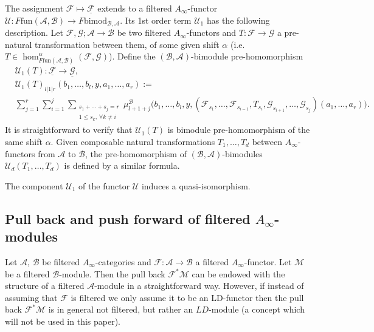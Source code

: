 The assignment $\mathcal{F} \longmapsto \underline{\mathcal{F}}$
extends to a filtered $A_{\infty}$-functor
$\mathcal{U}: F\text{fun}(\mathcal{A}, \mathcal{B}) \longrightarrow
F\text{bimod}_{\mathcal{B}, \mathcal{A}}$. Its 1st order term
$\mathcal{U}_1$ has the following description. Let
$\mathcal{F}, \mathcal{G}; \mathcal{A} \longrightarrow \mathcal{B}$ be
two filtered $A_{\infty}$-functors and
$T: \mathcal{F} \longrightarrow \mathcal{G}$ a pre-natural
transformation between them, of some given shift $\alpha$
(i.e.~$T \in \hom^{\alpha}_{F\text{fun}(\mathcal{A},
  \mathcal{B})}(\mathcal{F}, \mathcal{G})$). Define the
$(\mathcal{B}, \mathcal{A})$-bimodule pre-homomorphism
\begin{equation*}
  \begin{aligned}
    & \mathcal{U}_1(T)\colon \underline{\mathcal{F}} \longrightarrow \underline{\mathcal{G}},
    \\
    & \mathcal{U}_1(T)_{l|1|r}(b_1,\ldots, b_l, y,a_1,\ldots, a_r):= \\
    & \sum_{j=1}^r\sum_{i=1}^j\sum_{\substack
      {s_1 + \cdots + s_j = r  \\ 1 \leq s_k, \, 
    \forall k \neq i}}
    \mu^{\mathcal{B}}_{l+1+j}\bigl(b_1,\ldots, b_l,y, (\mathcal{F}_{s_1},\ldots,
    \mathcal{F}_{s_{i-1}},T_{s_i},\mathcal{G}_{s_{i+1}}, \ldots,
    \mathcal{G}_{s_j})(a_1,\ldots, a_r)\bigr).
  \end{aligned}
\end{equation*}
It is straightforward to verify that $\mathcal{U}_1(T)$ is bimodule
pre-homomorphism of the same shift $\alpha$. Given composable natural
transformations $T_1,\ldots, T_d$ between $A_\infty$-functors from
$\mathcal{A}$ to $\mathcal{B}$, the pre-homomorphism of
$(\mathcal{B},\mathcal{A})$-bimodules $\mathcal{U}_d(T_1,\ldots, T_d)$
is defined by a similar formula.

\begin{lem}
  The component $\mathcal{U}_1$ of the functor $\mathcal{U}$ induces a
  quasi-isomorphism.
\end{lem}


\subsection{Pull back and push forward of filtered
  $A_{\infty}$-modules} \label{ap:pshf}

Let $\mathcal{A}$, $\mathcal{B}$ be filtered $A_{\infty}$-categories
and $\mathcal{F} : \mathcal{A} \longrightarrow \mathcal{B}$ a filtered
$A_{\infty}$-functor. Let $\mathcal{M}$ be a filtered
$\mathcal{B}$-module. Then the pull back $\mathcal{F}^*\mathcal{M}$
can be endowed with the structure of a filtered $\mathcal{A}$-module
in a straightforward way. However, if instead of assuming that
$\mathcal{F}$ is filtered we only assume it to be an LD-functor then
the pull back $\mathcal{F}^*\mathcal{M}$ is in general not filtered,
but rather an $LD$-module (a concept which will not be used in this
paper).

